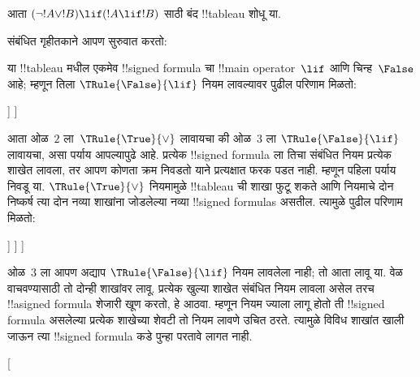 \documentclass[../../../include/open-logic-section]{subfiles}
\begin{document}
\begin{ex}
आता $(\lnot !A \lor !B) \lif (!A \lif !B)$ साठी बंद !!{tableau} शोधू या.

संबंधित गृहीतकाने आपण सुरुवात करतो:
\begin{oltableau}
  [\sFmla{\False}{(\lnot \formula{A} \lor \formula{B}) \lif
      (\formula{A} \lif \formula{B})}, just=\TAss]
\end{oltableau}
या !!{tableau} मधील एकमेव !!{signed formula} चा !!{main operator}~$\lif$
आणि चिन्ह~$\False$ आहे; म्हणून तिला $\TRule{\False}{\lif}$ नियम लावल्यावर
पुढील परिणाम मिळतो:
\begin{oltableau}
  [\sFmla{\False}{(\lnot \formula{A} \lor \formula{B})
      \lif (\formula{A} \lif \formula{B})}, just=\TAss, checked
    [\sFmla{\True}{\lnot \formula{A} \lor \formula{B}},
      just={\TRule{\False}{\lif}[1]}
      [\sFmla{\False}{(\formula{A} \lif \formula{B})},
        just={\TRule{\False}{\lif}[1]}
      ]
    ]
  ]
\end{oltableau}
आता ओळ~$2$ ला~$\TRule{\True}{\lor}$ लावायचा की ओळ~$3$ ला
$\TRule{\False}{\lif}$ लावायचा, असा पर्याय आपल्यापुढे आहे. प्रत्येक
!!{signed formula} ला तिचा संबंधित नियम प्रत्येक शाखेत लावला, तर आपण कोणता
क्रम निवडतो याने प्रत्यक्षात फरक पडत नाही. म्हणून पहिला पर्याय निवडू या.
$\TRule{\True}{\lor}$ नियमामुळे !!{tableau} ची शाखा फुटू शकते आणि नियमाचे
दोन निष्कर्ष त्या दोन नव्या शाखांना जोडलेल्या नव्या !!{signed formula}s
असतील. त्यामुळे पुढील परिणाम मिळतो:
\begin{oltableau}
  [\sFmla{\False}{(\lnot \formula{A} \lor \formula{B}) \lif
      (\formula{A} \lif \formula{B})}, just=\TAss, checked
    [\sFmla{\True}{\lnot \formula{A} \lor \formula{B}},
      just={\TRule{\False}{\lif}[1]}, checked
      [\sFmla{\False}{(\formula{A} \lif \formula{B})},
        just={\TRule{\False}{\lif}[1]}
        [\sFmla{\True}{\lnot \formula{A}}, just={\TRule{\True}{\lor}[2]}]
        [\sFmla{\True}{\formula{B}}, just={\TRule{\True}{\lor}[2]}]
      ]
    ]
  ]
\end{oltableau}
ओळ~$3$ ला आपण अद्याप $\TRule{\False}{\lif}$ नियम लावलेला नाही; तो आता
लावू या. वेळ वाचवण्यासाठी तो दोन्ही शाखांवर लावू. प्रत्येक खुल्या शाखेत
संबंधित नियम लावला असेल तरच !!a{signed formula} शेजारी खूण करतो, हे आठवा.
म्हणून नियम ज्याला लागू होतो ती !!{signed formula} असलेल्या प्रत्येक
शाखेच्या शेवटी तो नियम लावणे उचित ठरते. त्यामुळे विविध शाखांत खाली जाऊन त्या
!!{signed formula} कडे पुन्हा परतावे लागत नाही.
\begin{oltableau}
  [
\end{oltableau}
\end{ex}
\end{document}
